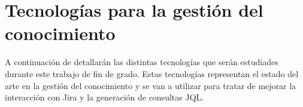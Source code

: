 \section{Tecnologías para la gestión del conocimiento}
A continuación de detallarán las distintas tecnologías que serán estudiades durante este trabajo de fin de grado. Estas tecnologías representan el estado del arte en la gestión del conocimiento y se van a utilizar para tratar de mejorar la interacción con Jira y la generación de consultas JQL.





